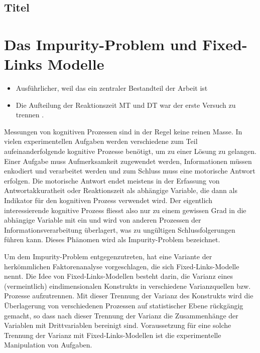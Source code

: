 \documentclass[11pt, twoside, a4paper]{book}		%
\begin{document}

%
%
%
%




\subsection{Titel}

\clearpage
\section{Das Impurity-Problem und Fixed-Links Modelle}

\begin{itemize}
	\item Ausführlicher, weil das ein zentraler Bestandteil der Arbeit ist
	\item Die Aufteilung der Reaktionszeit MT und DT \citep{Deary2000} war der erste Versuch zu trennen \citep{Jensen1979}.
\end{itemize}

Messungen von kognitiven Prozessen sind in der Regel keine reinen Masse. In vielen experimentellen Aufgaben werden verschiedene zum Teil aufeinanderfolgende kognitive Prozesse benötigt, um zu einer Lösung zu gelangen. Einer Aufgabe muss Aufmerksamkeit zugewendet werden, Informationen müssen enkodiert und verarbeitet werden und zum Schluss muss eine motorische Antwort erfolgen. Die motorische Antwort endet meistens in der Erfassung von Antwortakkuratheit oder Reaktionszeit als abhängige Variable, die dann als Indikator für den kognitiven Prozess verwendet wird. Der eigentlich interessierende kognitive Prozess fliesst also nur zu einem gewissen Grad in die abhängige Variable mit ein und wird von anderen Prozessen der Informationsverarbeitung überlagert, was zu ungültigen Schlussfolgerungen führen kann. Dieses Phänomen wird als Impurity-Problem bezeichnet.

Um dem Impurity-Problem entgegenzutreten, hat \citet{Schweizer2006a, Schweizer2006b} eine Variante der herkömmlichen Faktorenanalyse vorgeschlagen, die sich Fixed-Links-Modelle nennt. Die Idee von Fixed-Links-Modellen besteht darin, die Varianz eines (vermeintlich) eindimensionalen Konstrukts in verschiedene Varianzquellen bzw. Prozesse aufzutrennen. Mit dieser Trennung der Varianz des Konstrukts wird die Überlagerung von verschiedenen Prozessen auf statistischer Ebene rückgängig gemacht, so dass nach dieser Trennung der Varianz die Zusammenhänge der Variablen mit Drittvariablen bereinigt sind. Voraussetzung für eine solche Trennung der Varianz mit Fixed-Links-Modellen ist die experimentelle Manipulation von Aufgaben. 
\end{document}
